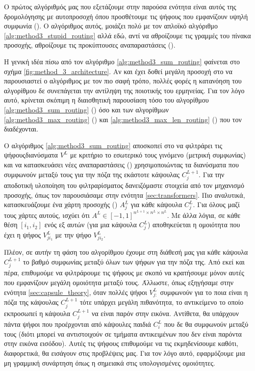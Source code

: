 Ο πρώτος αλγόριθμός μας που εξετάζουμε στην παρούσα ενότητα είναι αυτός της δρομολόγησης με αυτο\textendash προσοχή όπου προσθέτουμε τις ψήφους που εμφανίζουν υψηλή συμφωνία (). Ο αλγόριθμος αυτός, μοιάζει πολύ με τον απλοϊκό αλγόριθμο \ref{alg:method3_stupid_routing} αλλά εδώ, αντί να αθροίζουμε τις γραμμές του πίνακα προσοχής, αθροίζουμε τις προκύπτουσες αναπαραστάσεις (). \par

Η γενική ιδέα πίσω από τον αλγόριθμο \ref{alg:method3_sum_routing} φαίνεται στο σχήμα \ref{fig:method_3_architecture}. Αν και έχει δοθεί μεγάλη προσοχή στο να παρουσιαστεί ο αλγόριθμος με τον πιο σαφή τρόπο, πολλές φορές η κατανόηση του αλγορίθμου δε συνεπάγεται την αντίληψη της ποιοτικής του ερμηνείας. Για τον λόγο αυτό, κρίνεται σκόπιμη η διαισθητική παρουσίαση τόσο του αλγορίθμου \ref{alg:method3_sum_routing} () όσο και των αλγορίθμων \ref{alg:method3_max_routing} () και \ref{alg:method3_max_len_routing} () που τον διαδέχονται. \par

Ο αλγόριθμος \ref{alg:method3_sum_routing} αποσκοπεί στο να φιλτράρει τις ψήφους\textendash διανύσματα $V^L$ με κριτήριο το εσωτερικό τους γινόμενο (μετρική συμφωνίας) και να κατασκευάσει νέες αναπαραστάσεις () χρησιμοποιώντας τα διανύσματα που συμφωνούν μεταξύ τους για την πόζα της εκάστοτε κάψουλας $C_j^{L+1}$. Για την αποδοτική υλοποίηση του φιλτραρίσματος δανειζόμαστε στοιχεία από τον μηχανισμό προσοχής, όπως τον παρουσιάσαμε στην ενότητα \ref{sec:transformers}. Πιο αναλυτικά, κατασκευάζουμε ένα χάρτη προσοχής () $A_j^L$ για κάθε κάψουλα $C_j^L$. Για όλους μαζί τους χάρτες αυτούς, ισχύει ότι $A^L \in [-1,1]^{n^{L+1} \times n^L \times n^L}$. Με άλλα λόγια, σε κάθε θέση $[i_1,i_2]$ ενός εξ αυτών (για μια κάψουλα $C_j^L$) αποθηκεύεται η ομοιότητα που έχει η ψήφος $V^L_{ji_1}$ με την ψήφο $V_{ji_2}^L$.\par

Πλέον, σε αυτήν τη φάση του αλγορίθμου έχουμε στη διάθεσή μας για κάθε κάψουλα $C_j^{L+1}$ το βαθμό συμφωνίας μεταξύ όλων των ψήφων για την πόζα της. Από εκεί και πέρα, επιθυμούμε να φιλτράρουμε τις ψήφους με σκοπό να κρατήσουμε μόνον αυτές που εμφανίζουν μεγάλη ομοιότητα μεταξύ τους. Άλλωστε, όπως εξηγήσαμε στην ενότητα \ref{sec:capsule_theory}, όταν πολλές ψήφοι $V_{j:}^L$ συμφωνούν για το ποια είναι η πόζα της κάψουλας $C_j^{L+1}$ τότε υπάρχει μεγάλη πιθανότητα, το αντικείμενο το οποίο εκπροσωπεί η κάψουλα $C_j^{L+1}$ να είναι παρόν στην εικόνα. Αντίθετα, θα υπάρχουν πάντα ψήφοι που προέρχονται από κάψουλες παιδιά $C_i^L$ που δε θα συμφωνούν μεταξύ τους (διότι μπορεί να αντιστοιχούν σε τμήματα αντικειμένων που δεν είναι παρόντα στην εικόνα εισόδου). Αυτές τις ψήφους επιθυμούμε να τις εκμηδενίσουμε καθότι, διαφορετικά, θα εισάγουν  στις προβλέψεις μας. Για τον λόγο αυτό, εφαρμόζουμε μια μη γραμμική συνάρτηση όπως η  σημειακά στις υπολογισμένες ομοιότητες. \par

